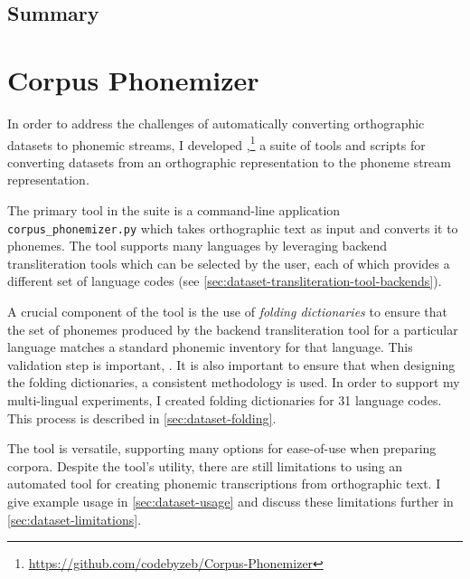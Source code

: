 \subsection{Summary}
\label{sec:dataset-background-summary}


\section{Corpus Phonemizer}
\label{sec:dataset-corpus-phonemizer}

In order to address the challenges of automatically converting orthographic datasets to phonemic streams, I developed \corpusphonemizer,\footnote{\url{https://github.com/codebyzeb/Corpus-Phonemizer}} a suite of tools and scripts for converting datasets from an orthographic representation to the phoneme stream representation.

The primary tool in the suite is a command-line application \texttt{corpus\_phonemizer.py} which takes orthographic text as input and converts it to phonemes. The tool supports many languages by leveraging backend transliteration tools which can be selected by the user, each of which provides a different set of language codes (see \cref{sec:dataset-transliteration-tool-backends}).

A crucial component of the tool is the use of \emph{folding dictionaries} to ensure that the set of phonemes produced by the backend transliteration tool for a particular language matches a standard phonemic inventory for that language. This validation step is important, . It is also important to ensure that when designing the folding dictionaries, a consistent methodology is used. In order to support my multi-lingual experiments, I created folding dictionaries for 31 language codes. This process is described in \cref{sec:dataset-folding}.

The tool is versatile, supporting many options for ease-of-use when preparing corpora. Despite the tool's utility, there are still limitations to using an automated tool for creating phonemic transcriptions from orthographic text. I give example usage in \cref{sec:dataset-usage} and discuss these limitations further in \cref{sec:dataset-limitations}.


